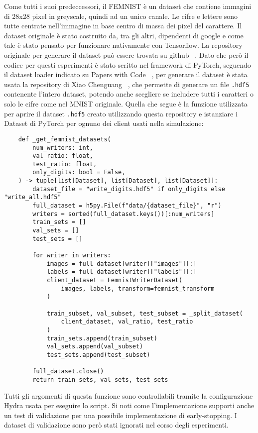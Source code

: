 Come tutti i suoi predeccessori, il FEMNIST è un dataset che contiene
immagini di 28x28 pixel in greyscale, quindi ad un unico canale. Le
cifre e lettere sono tutte centrate nell'immagine in base centro di 
massa dei pixel del carattere.
Il dataset originale è stato costruito da, tra gli 
altri, dipendenti di google e come tale è stato pensato per funzionare
nativamente con Tensorflow. La repository originale per generare il
dataset può essere trovata su github ~\cite{leaf_repo}. Dato che però
il codice per questi esperimenti è stato scritto nel framework di PyTorch,
seguendo il dataset loader indicato su Papers with Code ~\cite{femnist_pwc},
per generare il dataset è stata usata la repository di Xiao Chenguang 
~\cite{femnist_hdf5}, che permette di generare un file \texttt{.hdf5} contenente
l'intero dataset, potendo anche scegliere se includere tutti i caratteri
o solo le cifre come nel MNIST originale. Quella che segue è la funzione
utilizzata per aprire il dataset \texttt{.hdf5} creato utilizzando questa repository
e istanziare i Dataset di PyTorch per ognuno dei client usati nella
simulazione:

\clearpage
\begin{lstlisting}
    def _get_femnist_datasets(
        num_writers: int,
        val_ratio: float,
        test_ratio: float,
        only_digits: bool = False,
    ) -> tuple[list[Dataset], list[Dataset], list[Dataset]]:    
        dataset_file = "write_digits.hdf5" if only_digits else "write_all.hdf5"
        full_dataset = h5py.File(f"data/{dataset_file}", "r")
        writers = sorted(full_dataset.keys())[:num_writers]
        train_sets = []
        val_sets = []
        test_sets = []
    
        for writer in writers:
            images = full_dataset[writer]["images"][:]
            labels = full_dataset[writer]["labels"][:]
            client_dataset = FemnistWriterDataset(
                images, labels, transform=femnist_transform
            )
    
            train_subset, val_subset, test_subset = _split_dataset(
                client_dataset, val_ratio, test_ratio
            )
            train_sets.append(train_subset)
            val_sets.append(val_subset)
            test_sets.append(test_subset)
    
        full_dataset.close()
        return train_sets, val_sets, test_sets
\end{lstlisting}

Tutti gli argomenti di questa funzione sono controllabili tramite la
configurazione Hydra usata per eseguire lo script. Si noti come
l'implementazione supporti anche un test di validazione per una 
possibile implementazione di early-stopping. I dataset di validazione 
sono però stati ignorati nel corso degli esperimenti.



